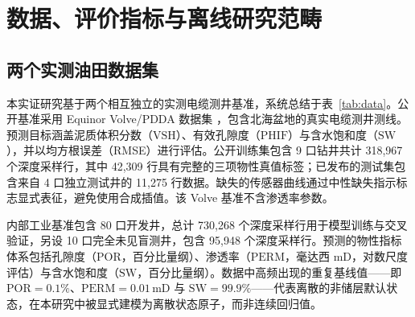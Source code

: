 \documentclass[preprint,12pt,nopreprintline]{elsarticle}
\begin{document}
\section{数据、评价指标与离线研究范畴}
\label{sec:data}

\subsection{两个实测油田数据集}
本实证研究基于两个相互独立的实测电缆测井基准，系统总结于表~\ref{tab:data}。公开基准采用 Equinor Volve/PDDA 数据集 \cite{volve2018,pddasig2021}，包含北海盆地的真实电缆测井测线。预测目标涵盖泥质体积分数（$\mathrm{VSH}$）、有效孔隙度（$\mathrm{PHIF}$）与含水饱和度（$\mathrm{SW}$），并以均方根误差（RMSE）进行评估。公开训练集包含 9 口钻井共计 318,967 个深度采样行，其中 42,309 行具有完整的三项物性真值标签；已发布的测试集包含来自 4 口独立测试井的 11,275 行数据。缺失的传感器曲线通过中性缺失指示标志显式表征，避免使用合成插值。该 Volve 基准不含渗透率参数。

内部工业基准包含 80 口开发井，总计 730,268 个深度采样行用于模型训练与交叉验证，另设 10 口完全未见盲测井，包含 95,948 个深度采样行。预测的物性指标体系包括孔隙度（$\mathrm{POR}$，百分比量纲）、渗透率（$\mathrm{PERM}$，毫达西 $\mathrm{mD}$，对数尺度评估）与含水饱和度（$\mathrm{SW}$，百分比量纲）。数据中高频出现的重复基线值——即 $\mathrm{POR}=0.1\%$、$\mathrm{PERM}=0.01\,\mathrm{mD}$ 与 $\mathrm{SW}=99.9\%$——代表离散的非储层默认状态，在本研究中被显式建模为离散状态原子，而非连续回归值。

\begin{table}[htbp]
\centering
\caption{两个离线实测油田数据基准的结构特征对比。因目标参数与评价指标不同，跨基准绝对性能不可直接横向数值对比。}
\label{tab:data}
\end{table}
\end{document}
